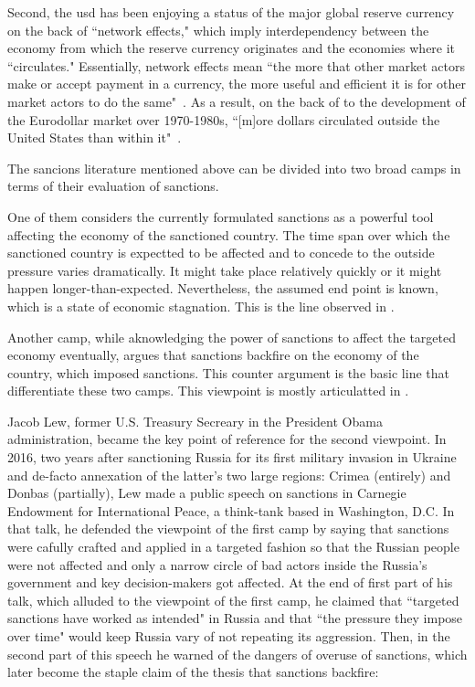 Second, the \acf{usd} has been enjoying a status of the major global reserve currency on the back of ``network effects," which imply interdependency between the economy from which the reserve currency originates and the economies where it ``circulates." Essentially, network effects mean ``the more that other market actors make or accept payment in a currency, the more useful and efficient it is for other market actors to do the same"~\citep[p.~21]{mcdowell}. As a result, on the back of to the development of the Eurodollar market over 1970-1980s, ``[m]ore dollars circulated outside the United States than within it"~\citep[p.~23]{farrell2023}.

The sancions literature mentioned above can be divided into two broad camps in terms of their evaluation of sanctions. 

One of them considers the currently formulated sanctions as a powerful tool affecting the economy of the sanctioned country. The time span over which the sanctioned country is expectted to be affected and to concede to the outside pressure varies dramatically. It might take place relatively quickly or it might happen longer-than-expected. Nevertheless, the assumed end point is known, which is a state of economic stagnation. This is the line observed in \citep{zarate2013,blackwill,baker2024}.

Another camp, while aknowledging the power of sanctions to affect the targeted economy eventually, argues that sanctions backfire on the economy of the country, which imposed sanctions. This counter argument is the basic line that differentiate these two camps. This viewpoint is mostly articulatted in \citep{lew2016,lew2018,mulder,demarais2022,mcdowell,farrell2023,mohsin2024}. 

Jacob Lew, former U.S. Treasury Secreary in the President Obama administration, became the key point of reference for the second viewpoint. In 2016, two years after sanctioning Russia for its first military invasion in Ukraine and de-facto annexation of the latter's two large regions: Crimea (entirely) and Donbas (partially), Lew made a public speech on sanctions in Carnegie Endowment for International Peace, a think-tank based in Washington, D.C. In that talk, he defended the viewpoint of the first camp by saying that sanctions were cafully crafted and applied in a targeted fashion so that the Russian people were not affected and only a narrow circle of bad actors inside the Russia's government and key decision-makers got affected. At the end of first part of his talk, which alluded to the viewpoint of the first camp, he claimed that ``targeted sanctions have worked as intended" in Russia and that ``the pressure they impose over time" would keep Russia vary of not repeating its aggression. Then, in the second part of this speech he warned of the dangers of overuse of sanctions, which later become the staple claim of the thesis that sanctions backfire:

